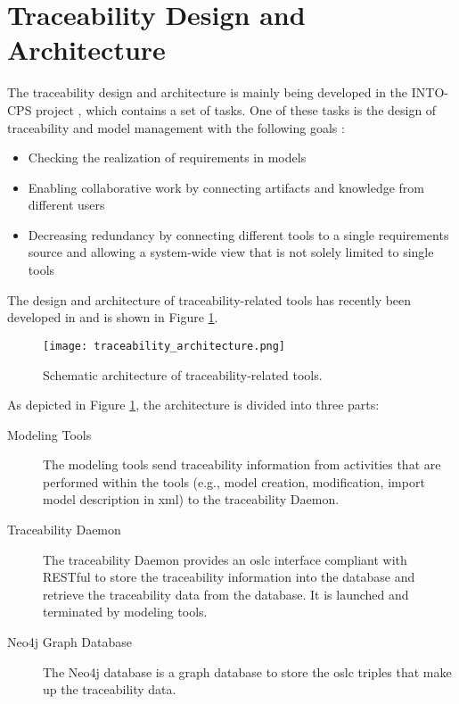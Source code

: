 \section{Traceability Design and Architecture}
\label{sec:tracaebilitydesign}


The traceability design and architecture is mainly being developed in the INTO-CPS project \cite{intocpspaper,intocps}, 
which contains a set of tasks. One of these tasks is the design of traceability and model management with the following goals \cite{intocpskenneth}:

\begin{itemize}
\item Checking the realization of requirements in models
\item Enabling collaborative work by connecting artifacts and knowledge from different users
\item Decreasing redundancy by connecting different tools to a single requirements source and allowing
a system-wide view that is not solely limited to single tools
\end{itemize}

The design and architecture of traceability-related tools has recently been developed in \cite{intocpskenneth} and is shown in Figure \ref{fig:traceabilityarchitecture}. 

\begin{figure} [!h]
	\texttt{[image: traceability\_architecture.png]}
	\caption{Schematic architecture of traceability-related tools.}
	\label{fig:traceabilityarchitecture}
\end{figure}


As depicted in Figure \ref{fig:traceabilityarchitecture}, the architecture is divided into three parts:

\begin{description}
\item[Modeling Tools] The modeling tools send traceability information from activities that are performed within the tools (e.g., model creation,
modification, import model description in \acrshort{xml}) to the traceability Daemon.
\item[Traceability Daemon] The traceability Daemon provides an \acrshort{oslc} interface compliant with RESTful \cite{restfulleonardo} to store the traceability 
information into the database and retrieve the traceability data from the database. It is launched and terminated by modeling tools.
\item[Neo4j Graph Database] The Neo4j database \cite{neo4j} is a graph database to store the \acrshort{oslc} triples that make up the traceability data. 
\end{description}

